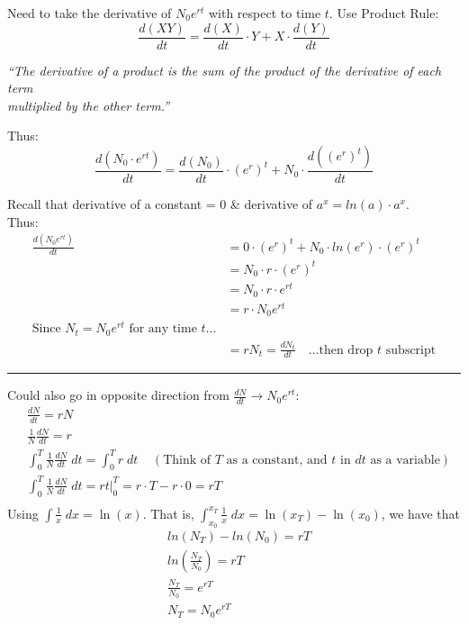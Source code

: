 \documentclass{article}
\newcommand*\circled[1]{\tikz[baseline=(char.base)]{
            \node[shape=circle,draw,inner sep=2pt] (char) {#1};}}
\begin{document}
Need to take the derivative of $N_0 e^{rt}$ with respect to time $t$.  Use Product Rule:
\begin{equation*}
\frac{d(XY)}{dt}=\frac{d(X)}{dt}\cdot Y + X \cdot \frac{d(Y)}{dt}
\end{equation*}
\begin{center}
\emph{``The derivative of a product is the sum of the product of the derivative of each term\\multiplied by the other term.''}
\end{center}
 Thus:
\begin{equation*}
\frac{d(N_0 \cdot e^{rt})}{dt}=\frac{d(N_0)}{dt}\cdot (e^r)^t + N_0 \cdot \frac{d((e^r)^t)}{dt}
\end{equation*}

Recall that derivative of a constant = 0  \& derivative of $a^x = ln(a)\cdot a^x$.\\
Thus:
\begin{align*}
	\frac{d(N_0 e ^{rt})}{dt} & =0 \cdot (e^r)^t + N_0 \cdot ln(e^r)\cdot (e^r)^t\\
	&=  N_0  \cdot r \cdot (e^r)^t \\
	&=  N_0 \cdot r \cdot e^{rt}\\
	&=   r \cdot N_0 e^{rt} \\
\text{Since } N_t=N_0 e^{rt} \text{ for any time } t ...&\\
	&=rN_t=\frac{dN_t}{dt} \quad \text{...then drop $t$ subscript}
\end{align*}


\rule[0.5ex]{\linewidth}{1pt}

\circled{4}
Could also go in opposite direction from $\frac{dN}{dt} \rightarrow N_0 e^{rt}$:
\begin{align*}
&	\frac{dN}{dt}=rN\\
&	\frac{1}{N}\frac{dN}{dt}=r\\
&	\int_0^T \frac{1}{N}\frac{dN}{dt} \; dt = \int_0^T r\; dt \;\;\;\;(\text{Think of }T \text{ as a constant, 
and }t\text{ in }dt\text{ as a variable})\\
&	\int_0^T \frac{1}{N}\frac{dN}{dt} \; dt = r t \vert_0^T = r \cdot T - r \cdot 0 = r T\\
\end{align*}
Using $\int \frac{1}{x}\; dx = \ln(x)$.  That is,  $\int_{x_0}^{x_T} \frac{1}{x}\; dx = \ln(x_T)-\ln(x_0)$, we 
have that
\begin{align*}
&	ln(N_T)-ln(N_0)=rT\\
& ln\left( \frac{N_T}{N_0}\right) = rT\\
& \frac{N_T}{N_0}= e^{rT}\\
& N_T=N_0e^{rT}
\end{align*}
\end{document}
